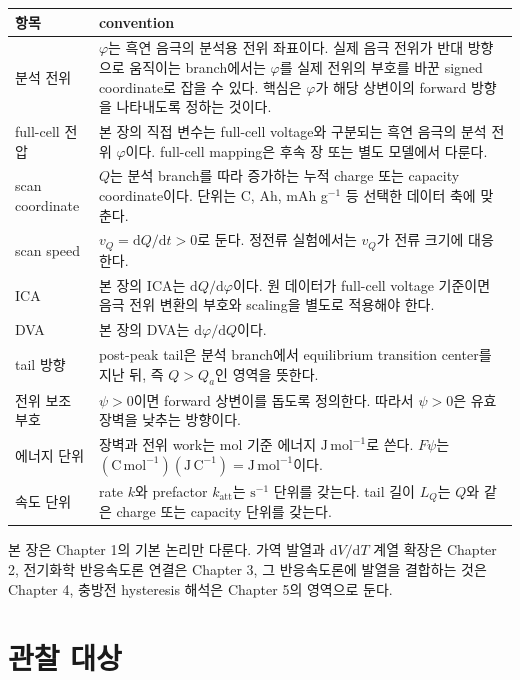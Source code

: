\documentclass[11pt]{article}
\newcommand{\dd}{\mathrm{d}}
\newcommand{\att}{\mathrm{att}}
\begin{document}
\begin{longtable}{p{}p{}}
\toprule
항목 & convention \\
\midrule
\endhead
분석 전위 & \(\varphi\)는 흑연 음극의 분석용 전위 좌표이다. 실제 음극 전위가 반대 방향으로 움직이는 branch에서는 \(\varphi\)를 실제 전위의 부호를 바꾼 signed coordinate로 잡을 수 있다. 핵심은 \(\varphi\)가 해당 상변이의 forward 방향을 나타내도록 정하는 것이다. \\
full-cell 전압 & 본 장의 직접 변수는 full-cell voltage와 구분되는 흑연 음극의 분석 전위 \(\varphi\)이다. full-cell mapping은 후속 장 또는 별도 모델에서 다룬다. \\
scan coordinate & \(Q\)는 분석 branch를 따라 증가하는 누적 charge 또는 capacity coordinate이다. 단위는 C, Ah, mAh g\(^{-1}\) 등 선택한 데이터 축에 맞춘다. \\
scan speed & \(v_Q=\dd Q/\dd t>0\)로 둔다. 정전류 실험에서는 \(v_Q\)가 전류 크기에 대응한다. \\
ICA & 본 장의 ICA는 \(\dd Q/\dd\varphi\)이다. 원 데이터가 full-cell voltage 기준이면 음극 전위 변환의 부호와 scaling을 별도로 적용해야 한다. \\
DVA & 본 장의 DVA는 \(\dd\varphi/\dd Q\)이다. \\
tail 방향 & post-peak tail은 분석 branch에서 equilibrium transition center를 지난 뒤, 즉 \(Q>Q_a\)인 영역을 뜻한다. \\
전위 보조 부호 & \(\psi>0\)이면 forward 상변이를 돕도록 정의한다. 따라서 \(\psi>0\)은 유효 장벽을 낮추는 방향이다. \\
에너지 단위 & 장벽과 전위 work는 mol 기준 에너지 \(\mathrm{J\,mol^{-1}}\)로 쓴다. \(F\psi\)는 \((\mathrm{C\,mol^{-1}})(\mathrm{J\,C^{-1}})=\mathrm{J\,mol^{-1}}\)이다. \\
속도 단위 & rate \(k\)와 prefactor \(k_{\att}\)는 \(\mathrm{s^{-1}}\) 단위를 갖는다. tail 길이 \(L_Q\)는 \(Q\)와 같은 charge 또는 capacity 단위를 갖는다. \\
\bottomrule
\end{longtable}

본 장은 Chapter 1의 기본 논리만 다룬다. 가역 발열과 \(\dd V/\dd T\) 계열 확장은 Chapter 2, 전기화학 반응속도론 연결은 Chapter 3, 그 반응속도론에 발열을 결합하는 것은 Chapter 4, 충방전 hysteresis 해석은 Chapter 5의 영역으로 둔다.

\section{관찰 대상}
\end{document}
